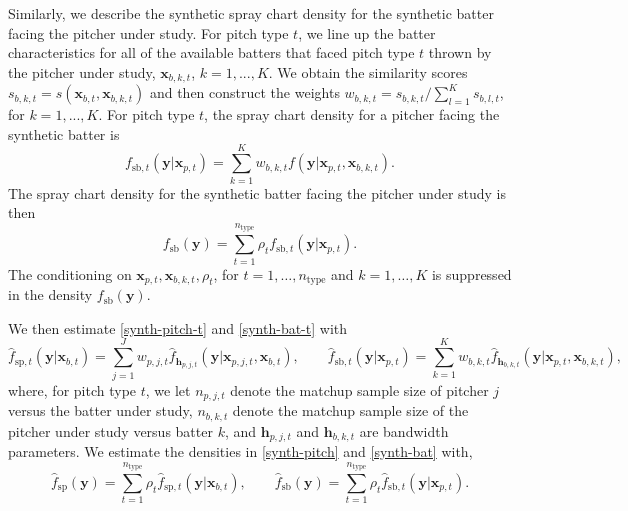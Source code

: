 \documentclass[12pt]{article}
\newcommand{\y}{\textbf{y}}
\newcommand{\x}{\textbf{x}}
\newcommand{\h}{\textbf{h}}
\begin{document}
Similarly, we describe the synthetic spray chart density for the synthetic batter facing the pitcher under study. For pitch type $t$, we line up the batter characteristics for all of the available batters that faced pitch type $t$ thrown by the pitcher under study, $\x_{b,k,t}$, $k = 1,...,K$.  We obtain the similarity scores $s_{b,k,t} = s(\x_{b,t},\x_{b,k,t})$ and then construct the weights $w_{b,k,t} = s_{b,k,t} / \sum_{l=1}^{K}s_{b,l,t}$, for $k = 1,...,K$. For pitch type $t$, the spray chart density for a pitcher facing the synthetic batter is
\begin{equation} \label{synth-bat-t}
  f_{\text{sb},t}(\y|\x_{p,t}) = \sum_{k=1}^K w_{b,k,t}f(\y|\x_{p,t},\x_{b,k,t}).
\end{equation}
The spray chart density for the synthetic batter facing the pitcher under study is then
\begin{equation} \label{synth-bat}
  f_{\text{sb}}(\y) = \sum_{t=1}^{n_{\text{type}}} \rho_t f_{\text{sb},t}(\y|\x_{p,t}).
\end{equation}
The conditioning on $\x_{p,t}, \x_{b,k,t}, \rho_t$, for $t = 1,\ldots,n_{\text{type}}$ and $k = 1,\ldots,K$ is suppressed in the density $f_{\text{sb}}(\y)$.


We then estimate \eqref{synth-pitch-t} and \eqref{synth-bat-t} with
\begin{equation} \label{synth-est-t}
  \hat f_{\text{sp},t}(\y|\x_{b,t}) = \sum_{j=1}^J w_{p,j,t}\hat f_{\h_{p,j,t}}(\y|\x_{p,j,t},\x_{b,t}),
  \qquad
  \hat f_{\text{sb}, t}(\y|\x_{p,t}) = \sum_{k=1}^K w_{b,k,t}\hat f_{\h_{b,k,t}}(\y|\x_{p,t},\x_{b,k,t}),
\end{equation}
where, for pitch type $t$, we let $n_{p,j,t}$ denote the matchup sample size of pitcher $j$ versus the batter under study, $n_{b,k,t}$ denote the matchup sample size of the pitcher under study versus batter $k$, and $\h_{p,j,t}$ and $\h_{b,k,t}$ are bandwidth parameters. We estimate the densities in \eqref{synth-pitch} and \eqref{synth-bat} with,
\begin{equation} \label{synth-est}
  \hat f_{\text{sp}}(\y) =  \sum_{t=1}^{n_{\text{type}}} \rho_t \hat f_{\text{sp}, t}(\y|\x_{b,t}),
  \qquad
  \hat f_{\text{sb}}(\y) = \sum_{t=1}^{n_{\text{type}}} \rho_t
    \hat f_{\text{sb}, t}(\y|\x_{p,t}).
\end{equation}
\end{document}
